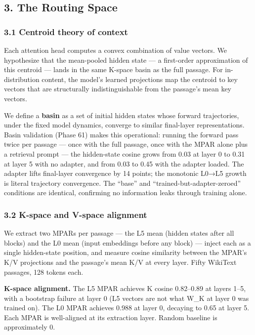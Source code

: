 \subsection{3. The Routing Space}\label{the-routing-space}

\subsubsection{3.1 Centroid theory of context}\label{centroid-theory-of-context}

Each attention head computes a convex combination of value vectors. We hypothesize that the mean-pooled hidden state --- a first-order approximation of this centroid --- lands in the same K-space basin as the full passage. For in-distribution content, the model's learned projections map the centroid to key vectors that are structurally indistinguishable from the passage's mean key vectors.

We define a \textbf{basin} as a set of initial hidden states whose forward trajectories, under the fixed model dynamics, converge to similar final-layer representations. Basin validation (Phase 61) makes this operational: running the forward pass twice per passage --- once with the full passage, once with the MPAR alone plus a retrieval prompt --- the hidden-state cosine grows from 0.03 at layer 0 to 0.31 at layer 5 with no adapter, and from 0.03 to 0.45 with the adapter loaded. The adapter lifts final-layer convergence by 14 points; the monotonic L0→L5 growth is literal trajectory convergence. The ``base'' and ``trained-but-adapter-zeroed'' conditions are identical, confirming no information leaks through training alone.

\subsubsection{3.2 K-space and V-space alignment}\label{k-space-and-v-space-alignment}

We extract two MPARs per passage --- the L5 mean (hidden states after all blocks) and the L0 mean (input embeddings before any block) --- inject each as a single hidden-state position, and measure cosine similarity between the MPAR's K/V projections and the passage's mean K/V at every layer. Fifty WikiText passages, 128 tokens each.

\textbf{K-space alignment.} The L5 MPAR achieves K cosine 0.82--0.89 at layers 1--5, with a bootstrap failure at layer 0 (L5 vectors are not what W\_K at layer 0 was trained on). The L0 MPAR achieves 0.988 at layer 0, decaying to 0.65 at layer 5. Each MPAR is well-aligned at its extraction layer. Random baseline is approximately 0.

